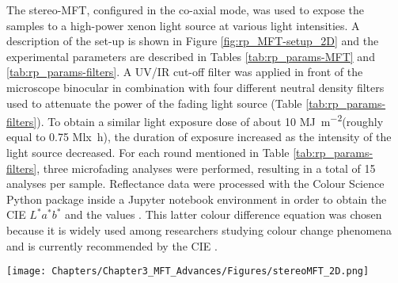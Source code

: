 The stereo-MFT, configured in the co-axial mode, was used to expose the samples to a high-power xenon light source at various light intensities. A description of the set-up is shown in Figure \ref{fig:rp_MFT-setup_2D} and the experimental parameters are described in Tables \ref{tab:rp_params-MFT} and \ref{tab:rp_params-filters}. A \gls{UV}/\gls{IR} cut-off filter was applied in front of the microscope binocular in combination with four different neutral density filters used to attenuate the power of the fading light source (Table \ref{tab:rp_params-filters}). To obtain a similar light exposure dose of about 10 \unit{\mega\joule\per\square\metre}(roughly equal to 0.75 \unit{\mega\lux\hour}), the duration of exposure increased as the intensity of the light source decreased. For each round mentioned in Table \ref{tab:rp_params-filters}, three microfading analyses were performed, resulting in a total of 15 analyses per sample. Reflectance data were processed with the Colour Science Python package \citep{mansencal_colour_2022} inside a Jupyter notebook environment \citep{harris_array_2020, hunter_matplotlib_2007, kluyver_jupyter_2016, mckinney_data_2010} in order to obtain the CIE $L^*a^*b^*$ and the \dEOO values \citep{luo_development_2001}. This latter colour difference equation was chosen because it is widely used among researchers studying colour change phenomena and is currently recommended by the \gls{CIE} \citep{cie_technical_committee_1-55_recommended_2016}.\\

\begin{figure*}
\centering
\texttt{[image: Chapters/Chapter3\_MFT\_Advances/Figures/stereoMFT\_2D.png]}
\caption[\hspace{0.3cm}2D representation of the stereo-MFT]{2D representation of the stereo-MFT in the co-axial configuration.}
\label{fig:rp_MFT-setup_2D}
\end{figure*}


